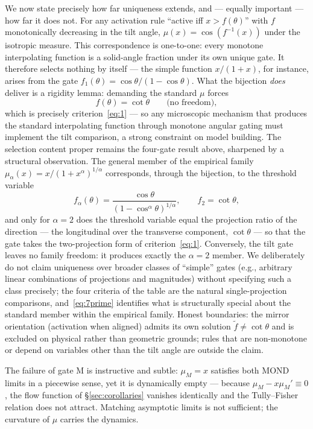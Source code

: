 \documentclass[11pt]{article}
\theoremstyle{plain}
\begin{document}
We now state precisely how far uniqueness extends, and --- equally important --- how far it does not. For any activation rule ``active iff $x>f(\theta)$'' with $f$ monotonically decreasing in the tilt angle, $\mu(x)=\cos(f^{-1}(x))$ under the isotropic measure. This correspondence is one-to-one: every monotone interpolating function is a solid-angle fraction under its own unique gate. It therefore selects nothing by itself --- the simple function $x/(1+x)$, for instance, arises from the gate $f_1(\theta)=\cos\theta/(1-\cos\theta)$. What the bijection \emph{does} deliver is a rigidity lemma: demanding the standard $\mu$ forces
\begin{equation*}\tag{7}\label{eq:7}
f(\theta) = \cot\theta \qquad \text{(no freedom)},
\end{equation*}
which is precisely criterion~\eqref{eq:1} --- so any microscopic mechanism that produces the standard interpolating function through monotone angular gating must implement the tilt comparison, a strong constraint on model building. The selection content proper remains the four-gate result above, sharpened by a structural observation. The general member of the empirical family $\mu_\alpha(x) = x/(1+x^\alpha)^{1/\alpha}$ corresponds, through the bijection, to the threshold variable
\begin{equation*}\tag{7$'$}\label{eq:7prime}
f_\alpha(\theta) = \frac{\cos\theta}{(1-\cos^\alpha\theta)^{1/\alpha}}, \qquad f_2 = \cot\theta,
\end{equation*}
and only for $\alpha=2$ does the threshold variable equal the projection ratio of the direction --- the longitudinal over the transverse component, $\cot\theta$ --- so that the gate takes the two-projection form of criterion~\eqref{eq:1}. Conversely, the tilt gate leaves no family freedom: it produces exactly the $\alpha=2$ member. We deliberately do not claim uniqueness over broader classes of ``simple'' gates (e.g., arbitrary linear combinations of projections and magnitudes) without specifying such a class precisely; the four criteria of the table are the natural single-projection comparisons, and~\eqref{eq:7prime} identifies what is structurally special about the standard member within the empirical family. Honest boundaries: the mirror orientation (activation when aligned) admits its own solution $\tilde f \neq \cot\theta$ and is excluded on physical rather than geometric grounds; rules that are non-monotone or depend on variables other than the tilt angle are outside the claim.

The failure of gate M is instructive and subtle: $\mu_M = x$ satisfies both MOND limits in a piecewise sense, yet it is dynamically empty --- because $\mu_M - x\mu_M' \equiv 0$, the flow function of \S\ref{sec:corollaries} vanishes identically and the Tully--Fisher relation does not attract. Matching asymptotic limits is not sufficient; the curvature of $\mu$ carries the dynamics.
\end{document}
